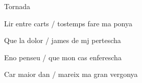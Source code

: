 \documentclass[12pt]{article}
\begin{document}
\begin{estrofaExtra}%




\begin{tornada}

Tornada

\end{tornada}


\end{estrofaExtra}


\begin{estrofa}

 Lir entre carts / tostemps fare ma ponya

 Que la dolor / james de mj pertescha

 Eno penseu / que mon cas enferescha

 Car maior dan / mareix ma gran vergonya

\end{estrofa}
\end{document}
